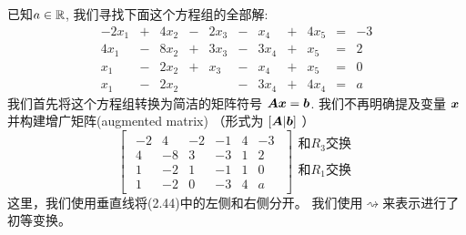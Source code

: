 \begin{example}
    已知$a \in \mathbb{R}$, 我们寻找下面这个方程组的全部解:
    \begin{equation}
        \begin{array}{rcrcrcrcrcr}
            -2x_1 & + & 4x_2 & - & 2x_3 & - & x_4  & + & 4x_5 & = & -3 \\
            4x_1  & - & 8x_2 & + & 3x_3 & - & 3x_4 & + & x_5  & = & 2 \\
            x_1   & - & 2x_2 & + & x_3  & - & x_4  & + & x_5  & = & 0 \\
            x_1   & - & 2x_2 &   &      & - & 3x_4 & + & 4x_4 & = & a
        \end{array}
    \end{equation}
    我们首先将这个方程组转换为简洁的矩阵符号 $\boldsymbol{A}\boldsymbol{x} = \boldsymbol{b}$.
    我们不再明确提及变量 $\boldsymbol{x}$ 并构建增广矩阵(augmented matrix)
    （形式为 $[\boldsymbol{A} | \boldsymbol{b} ]$ ）
    \[
        \begin{bmatrix}
        \begin{array}{rrrrr|r}
            −2 & 4 & −2 & −1 & 4 & −3 \\
            4 & −8 & 3 & −3 & 1 &  2 \\
            1 & −2 & 1 & -1 & 1 & 0 \\
            1 & -2 & 0 & -3 & 4 & a
        \end{array}
        \end{bmatrix}
        \begin{array}{l}
            \text{和}R_3\text{交换}\\
            \\
            \text{和}R_1\text{交换}\\
            \\
        \end{array}
    \]
    这里，我们使用垂直线将(2.44)中的左侧和右侧分开。
    我们使用$\rightsquigarrow$来表示进行了初等变换。


\end{example}
